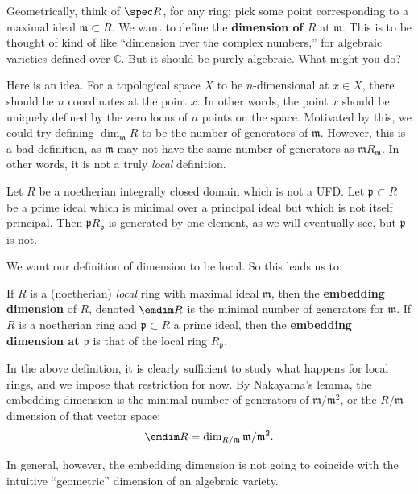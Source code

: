 Geometrically, think of $\spec R$, for any ring; pick some point corresponding to a maximal
ideal $\mathfrak{m} \subset R$. We want to define the \textbf{dimension of $R$}
at $\mathfrak{m}$. This is to be thought of kind of like ``dimension over the
complex numbers,'' for algebraic varieties defined over $\mathbb{C}$. But it
should be purely algebraic. 
What might you do?


Here  is an idea. For a topological space $X$ to be $n$-dimensional at $x \in
X$, there should be $n$ coordinates at the point $x$. In other words, the
point $x$ should be uniquely  defined
by the zero locus of $n$ points on the space.
Motivated by this, we could try defining $\dim_{\mathfrak{m}} R$
to be the number of generators of $\mathfrak{m}$.
However, this is a bad definition, as $\mathfrak{m}$ may not have the same number of
generators as $\mathfrak{m}R_{\mathfrak{m}}$. In other words, it is not a
truly \emph{local} definition.
\begin{example} 
Let $R$ be a noetherian integrally closed domain which is not a UFD. Let $\mathfrak{p}
\subset R$ be a prime ideal which is minimal over a principal ideal but which
is not itself principal. Then $\mathfrak{p}R_{\mathfrak{p}}$ is generated by
one element, as we will eventually see, but $\mathfrak{p}$ is not.
\end{example} 

We want our definition of dimension to be
local.
So this leads us to:
\begin{definition} 
If $R$ is a (noetherian) \emph{local} ring with maximal ideal $\mathfrak{m}$,
then the \textbf{embedding dimension} of $R$, denoted $\emdim R$ is
the minimal number of generators for $\mathfrak{m}$. If $R$ is a  noetherian
ring and $\mathfrak{p} \subset R$ a prime ideal, then the \textbf{embedding
dimension at $\mathfrak{p}$} is that of the local ring $R_{\mathfrak{p}}$.
\end{definition} 

In the above definition, it is clearly sufficient to study what happens for
local rings, and we impose that restriction for now. By Nakayama's lemma, the
embedding dimension is the minimal number of generators of
$\mathfrak{m}/\mathfrak{m}^2$, or the $R/\mathfrak{m}$-dimension of that vector
space:
\[ \emdim R = \dim_{R/\mathfrak{m}} \mathfrak{m}/ \mathfrak{m}^2.  \]


In general, however, the embedding dimension is not going to coincide with the
intuitive ``geometric'' dimension of an algebraic
variety.

